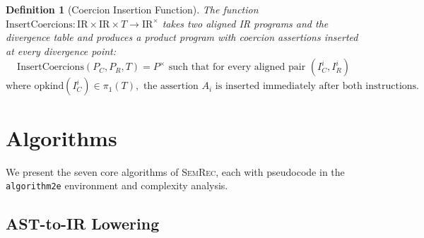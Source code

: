 \documentclass[11pt]{article}
\newtheorem{definition}[theorem]{Definition}
\newcommand{\IR}{\mathrm{IR}}
\newcommand{\opkind}{\mathrm{opkind}}
\begin{document}
\begin{definition}[Coercion Insertion Function]
\label{def:insertcoercions}
The function $\mathrm{InsertCoercions} : \IR \times \IR \times T \to \IR^\times$ takes two aligned IR programs and the divergence table and produces a product program with coercion assertions inserted at every divergence point:
\[
\mathrm{InsertCoercions}(P_C, P_R, T) = P^\times \text{ such that for every aligned pair } (I_C^i, I_R^i)
\]
\[
\text{where } \opkind(I_C^i) \in \pi_1(T), \text{ the assertion } A_i \text{ is inserted immediately after both instructions.}
\]
\end{definition}


\section{Algorithms}
\label{sec:algorithms}

We present the seven core algorithms of \textsc{SemRec}, each with pseudocode in the \texttt{algorithm2e} environment and complexity analysis.

\subsection{AST-to-IR Lowering}
\label{sec:alg-lowering}
\end{document}
